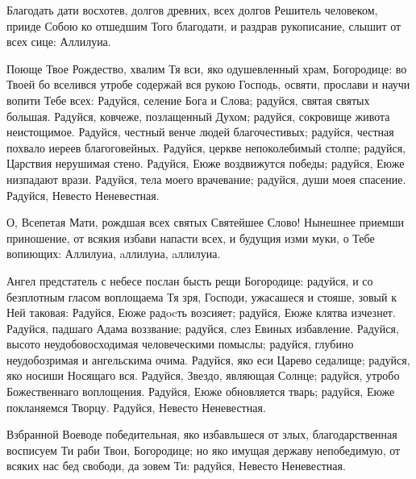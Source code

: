 \begin{mymulticols}

Благодать дати восхотев, долгов древних, всех долгов Решитель человеком, прииде Собою ко отшедшим Того благодати, и раздрав рукописание, слышит от всех сице: Аллилуиа.


Поюще Твое Рождество, хвалим Тя вси, яко одушевленный храм, Богородице: во Твоей бо вселився утробе содержай вся рукою Господь, освяти, прослави и научи вопити Тебе всех: Радуйся, селение Бога и Слова; радуйся, святая святых большая. Радуйся, ковчеже, позлащенный Духом; радуйся, сокровище живота неистощимое. Радуйся, честный венче людей благочестивых; радуйся, честная похвало иереев благоговейных. Радуйся, церкве непоколебимый столпе; радуйся, Царствия нерушимая стено. Радуйся, Еюже воздвижутся победы; радуйся, Еюже низпадают врази. Радуйся, тела моего врачевание; радуйся, души моея спасение. Радуйся, Невесто Неневестная.


О, Всепетая Мати, рождшая всех святых Святейшее Слово! Нынешнее приемши приношение, от всякия избави напасти всех, и будущия изми муки, о Тебе вопиющих: Аллилуиа, aллилуиа, aллилуиа.



Ангел предстатель с небесе послан бысть рещи Богородице: радуйся, и со безплотным гласом воплощаема Тя зря, Господи, ужасашеся и стояше, зовый к Ней таковая: Радуйся, Еюже радocть возсияет; радуйся, Еюже клятва изчезнет. Радуйся, падшаго Адама воззвание; радуйся, слез Евиных избавление. Радуйся, высото неудобовосходимая человеческими помыслы; радуйся, глубино неудобозримая и ангельскима очима. Радуйся, яко еси Царево седалище; радуйся, яко носиши Носящаго вся. Радуйся, Звездо, являющая Солнце; радуйся, утробо Божественнаго воплощения. Радуйся, Еюже обновляется тварь; радуйся, Еюже покланяемся Творцу. Радуйся, Невесто Неневестная.


Взбранной Воеводе победительная, яко избавльшеся от злых, благодарственная восписуем Ти раби Твои, Богородице; но яко имущая державу непобедимую, от всяких нас бед свободи, да зовем Ти: радуйся, Невесто Неневестная.



\end{mymulticols}
